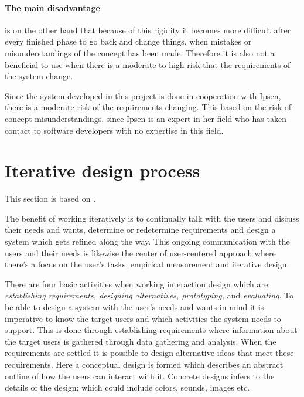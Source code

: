 \paragraph{The main disadvantage} is on the other hand that because of this rigidity it becomes more difficult after every finished phase to go back and change things, when mistakes or misunderstandings of the concept has been made.
Therefore it is also not a beneficial to use when there is a moderate to high risk that the requirements of the system change.

Since the system developed in this project is done in cooperation with Ipsen, there is a moderate risk of the requirements changing.
This based on the risk of concept misunderstandings, since Ipsen is an expert in her field who has taken contact to software developers with no expertise in this field.

\section{Iterative design process} \label{sec:iterativ}
This section is based on \cite{InteractionDesign}.

The benefit of working iteratively is to continually talk with the users and discuss their needs and wants, determine or redetermine requirements and design a system which gets refined along the way.
This ongoing communication with the users and their needs is likewise the center of user-centered approach where there’s a focus on the user’s tasks, empirical measurement and iterative design.

There are four basic activities when working interaction design which are;
\textit{establishing requirements, designing alternatives, prototyping,} and \textit{evaluating}.
To be able to design a system with the user’s needs and wants in mind it is imperative to know the target users and which activities the system needs to support.
This is done through establishing requirements where information about the target users is gathered through data gathering and analysis.
When the requirements are settled it is possible to design alternative ideas that meet these requirements.
Here a conceptual design is formed which describes an abstract outline of how the users can interact with it.
Concrete designs infers to the details of the design; which could include colors, sounds, images etc. 

